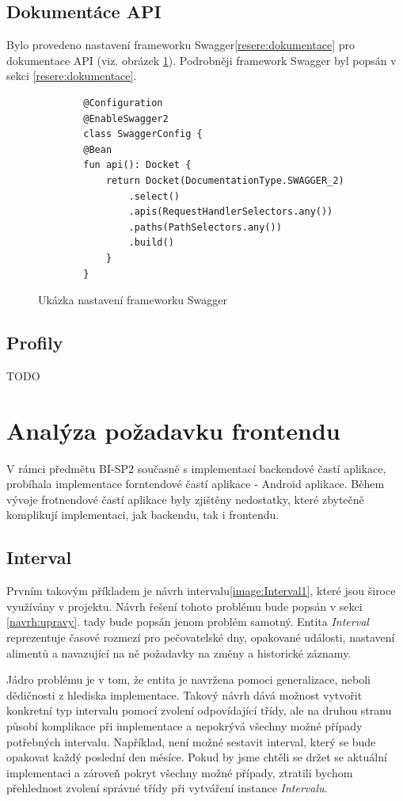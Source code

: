     \subsection{Dokumentáce API}
        Bylo provedeno nastavení frameworku Swagger\ref{resere:dokumentace} pro dokumentace API (viz. obrázek \ref{code:swagger-configuration}). Podrobněji framework Swagger byl popsán v sekci \ref{resere:dokumentace}.
        \begin{figure}
        \begin{verbatim}
        @Configuration
        @EnableSwagger2
        class SwaggerConfig {
        @Bean
        fun api(): Docket {
            return Docket(DocumentationType.SWAGGER_2)
                .select()
                .apis(RequestHandlerSelectors.any())
                .paths(PathSelectors.any())
                .build()
            }
        }
        \end{verbatim}
        \caption{Ukázka nastavení frameworku Swagger}\label{code:swagger-configuration}
        \end{figure}
    
    \subsection{Profily}
    TODO
    
\section{Analýza požadavku frontendu}\label{analyza:pozadavky-frontendu}
    V rámci předmětu BI-SP2 současně s implementací backendové častí aplikace, probíhala implementace forntendové častí aplikace - Android aplikace. Během vývoje frotnendové častí aplikace byly zjištěny nedostatky, které zbytečně komplikují implementaci, jak backendu, tak i frontendu.
    \subsection{Interval}
        Prvním takovým příkladem je návrh intervalu\ref{image:Interval1}, které jsou široce využívány v projektu. Návrh řešení tohoto problému bude popsán v sekci \ref{navrh:upravy}. tady bude popsán jenom problém samotný. Entita \textit{Interval} reprezentuje časové rozmezí pro pečovatelské dny, opakované události, nastavení alimentů a navazující na ně požadavky na změny a historické záznamy.
            
        Jádro problému je v tom, že entita je navržena pomoci generalizace, neboli dědičnosti z hlediska implementace. Takový návrh dává možnost vytvořit konkretní typ intervalu pomocí zvolení odpovídající třídy, ale na druhou stranu působí komplikace při implementace a nepokrývá všechny možné případy potřebných intervalu. Například, není možné sestavit interval, který se bude opakovat každý poslední den měsíce. Pokud by jsme chtěli se držet se aktuální implementaci a zároveň pokryt všechny možné případy, ztratili bychom přehlednost zvolení správné třídy při vytváření instance \textit{Intervalu}.
            
